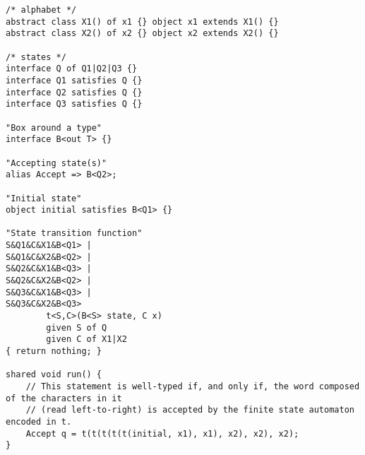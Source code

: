 \documentclass[a4paper, 11pt]{article}
\theoremstyle{definition}
\begin{document}

\begin{verbatim}
/* alphabet */
abstract class X1() of x1 {} object x1 extends X1() {}
abstract class X2() of x2 {} object x2 extends X2() {}

/* states */
interface Q of Q1|Q2|Q3 {}
interface Q1 satisfies Q {}
interface Q2 satisfies Q {}
interface Q3 satisfies Q {}

"Box around a type"
interface B<out T> {}

"Accepting state(s)"
alias Accept => B<Q2>;

"Initial state"
object initial satisfies B<Q1> {}

"State transition function"
S&Q1&C&X1&B<Q1> |
S&Q1&C&X2&B<Q2> |
S&Q2&C&X1&B<Q3> |
S&Q2&C&X2&B<Q2> |
S&Q3&C&X1&B<Q3> |
S&Q3&C&X2&B<Q3>
        t<S,C>(B<S> state, C x)
        given S of Q
        given C of X1|X2
{ return nothing; }

shared void run() {
    // This statement is well-typed if, and only if, the word composed of the characters in it
    // (read left-to-right) is accepted by the finite state automaton encoded in t.
    Accept q = t(t(t(t(t(initial, x1), x1), x2), x2), x2);
}
\end{verbatim}
\end{document}
